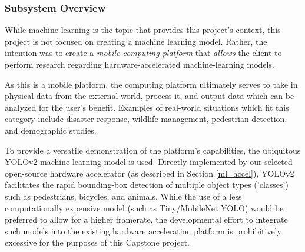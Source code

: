 
% 

\subsubsection{Subsystem Overview} \label{ml_desc}
While machine learning is the topic that provides this project's context, this project is not focused on creating a machine learning model. Rather, the intention was to create a \textit{mobile computing platform} that \textit{allows} the client to perform research regarding hardware-accelerated machine-learning models.

As this is a mobile platform, the computing platform ultimately serves to take in physical data from the external world, process it, and output data which can be analyzed for the user's benefit. Examples of real-world situations which fit this category include disaster response, wildlife management, pedestrian detection, and demographic studies.

To provide a versatile demonstration of the platform's capabilities, the ubiquitous YOLOv2 machine learning model is used. Directly implemented by our selected open-source hardware accelerator (as described in Section \ref{ml_accel}), YOLOv2 facilitates the rapid bounding-box detection of multiple object types ('classes') such as pedestrians, bicycles, and animals. While the use of a less computationally expensive model (such as Tiny/MobileNet YOLO) would be preferred to allow for a higher framerate, the developmental effort to integrate such models into the existing hardware acceleration platform is prohibitively excessive for the purposes of this Capstone project.

